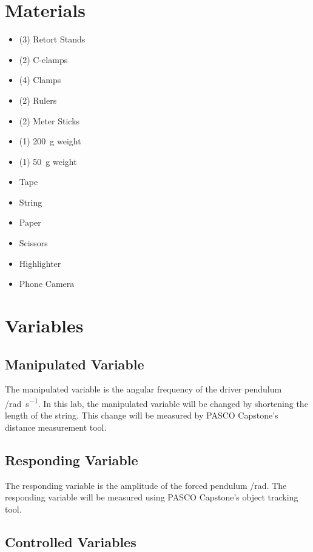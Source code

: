 \documentclass[letterpaper, 12pt]{article}
\begin{document}
\section{Materials}

\begin{multicols}{2}
    \begin{itemize}
        \item (3) Retort Stands
        \item (2) C-clamps
        \item (4) Clamps
        \item (2) Rulers
        \item (2) Meter Sticks
        \item (1) \SI{200}{g} weight
        \item (1) \SI{50}{g} weight
        \item Tape
        \item String
        \item Paper
        \item Scissors
        \item Highlighter
        \item Phone Camera
    \end{itemize}
\end{multicols}

\section{Variables}

\subsection{Manipulated Variable}
The manipulated variable is the angular frequency of the driver pendulum
/\unit{rad.s^{-1}}. In this lab, the manipulated variable will be changed
by shortening the length of the string. This change will be measured by
PASCO Capstone's distance measurement tool.

\subsection{Responding Variable}
The responding variable is the amplitude of the forced pendulum /\unit{rad}.
The responding variable will be measured using PASCO Capstone's
object tracking tool.

\subsection{Controlled Variables}
\end{document}

